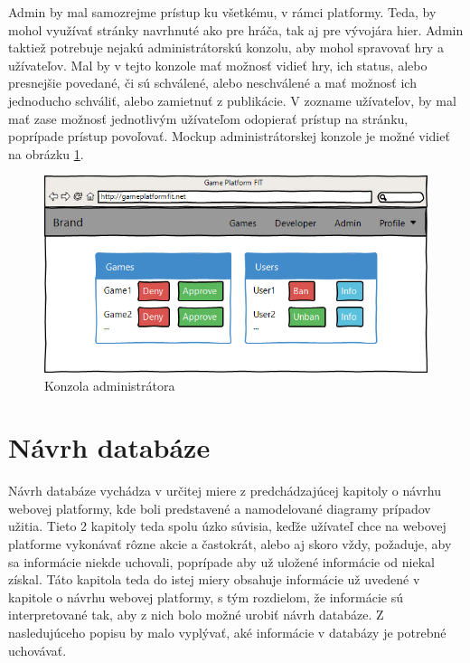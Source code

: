 Admin by mal samozrejme prístup ku všetkému, v rámci platformy. Teda, by mohol využívať stránky navrhnuté ako pre hráča, tak aj pre vývojára hier. Admin taktiež potrebuje nejakú administrátorskú konzolu, aby mohol spravovať hry a užívateľov. Mal by v tejto konzole mať možnosť vidieť hry, ich status, alebo presnejšie povedané, či sú schválené, alebo neschválené a mať možnosť ich jednoducho schváliť, alebo zamietnuť z publikácie. V zozname užívateľov, by mal mať zase možnosť jednotlivým užívateľom odopierať prístup na stránku, poprípade prístup povoľovať. Mockup administrátorskej konzole je možné vidieť na obrázku \ref{fig:guiadmin}.
\begin{figure}[h]
  \centering
  \includegraphics[scale=0.35]{fig/gui-admin.png}
  \caption{Konzola administrátora}
  \label{fig:guiadmin}
\end{figure}

\section{Návrh databáze}
Návrh databáze vychádza v určitej miere z predchádzajúcej kapitoly o návrhu webovej platformy, kde boli predstavené a namodelované diagramy prípadov užitia. Tieto 2 kapitoly teda spolu úzko súvisia, keďže užívateľ chce na webovej platforme vykonávať rôzne akcie a častokrát, alebo aj skoro vždy, požaduje, aby sa informácie niekde uchovali, poprípade aby už uložené informácie od niekal získal. Táto kapitola teda do istej miery obsahuje informácie už uvedené v kapitole o návrhu webovej platformy, s tým rozdielom, že informácie sú interpretované tak, aby z nich bolo možné urobiť návrh databáze. Z nasledujúceho popisu by malo vyplývať, aké informácie v databázy je potrebné uchovávať. 

